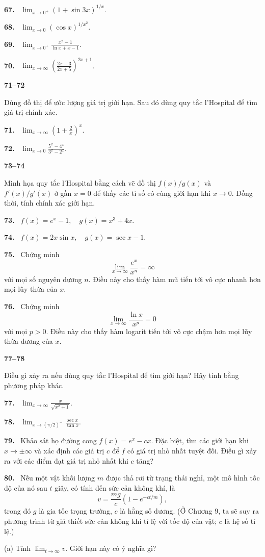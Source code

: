 \documentclass[12pt,a4paper]{article}
\newcommand{\bt}[1]{\par\smallskip\Needspace{5\baselineskip}\noindent\textbf{#1.}\ }
\newcommand{\group}[1]{\par\medskip\noindent\textbf{#1}\par\nopagebreak[4]}
\begin{document}
\bt{67} $\displaystyle\lim_{x\to0^+}(1+\sin3x)^{1/x}$.
\bt{68} $\displaystyle\lim_{x\to0}(\cos x)^{1/x^2}$.
\bt{69} $\displaystyle\lim_{x\to0^+}\frac{x^x-1}{\ln x+x-1}$.
\bt{70} $\displaystyle\lim_{x\to\infty}\left(\frac{2x-3}{2x+5}\right)^{2x+1}$.
\group{71–72} Dùng đồ thị để ước lượng giá trị giới hạn. Sau đó dùng quy tắc l’Hospital để tìm giá trị chính xác.
\bt{71} $\displaystyle\lim_{x\to\infty}\left(1+\frac2x\right)^x$.
\bt{72} $\displaystyle\lim_{x\to0}\frac{5^x-4^x}{3^x-2^x}$.
\group{73–74} Minh họa quy tắc l’Hospital bằng cách vẽ đồ thị $f(x)/g(x)$ và $f'(x)/g'(x)$ ở gần $x=0$ để thấy các tỉ số có cùng giới hạn khi $x\to0$. Đồng thời, tính chính xác giới hạn.
\bt{73} $f(x)=e^x-1,\quad g(x)=x^3+4x$.
\bt{74} $f(x)=2x\sin x,\quad g(x)=\sec x-1$.
\bt{75} Chứng minh
\[\lim_{x\to\infty}\frac{e^x}{x^n}=\infty\]
với mọi số nguyên dương $n$. Điều này cho thấy hàm mũ tiến tới vô cực nhanh hơn mọi lũy thừa của $x$.
\bt{76} Chứng minh
\[\lim_{x\to\infty}\frac{\ln x}{x^p}=0\]
với mọi $p>0$. Điều này cho thấy hàm logarit tiến tới vô cực chậm hơn mọi lũy thừa dương của $x$.
\group{77–78} Điều gì xảy ra nếu dùng quy tắc l’Hospital để tìm giới hạn? Hãy tính bằng phương pháp khác.
\bt{77} $\displaystyle\lim_{x\to\infty}\frac{x}{\sqrt{x^2+1}}$.
\bt{78} $\displaystyle\lim_{x\to(\pi/2)^-}\frac{\sec x}{\tan x}$.
\bt{79} Khảo sát họ đường cong $f(x)=e^x-cx$. Đặc biệt, tìm các giới hạn khi $x\to\pm\infty$ và xác định các giá trị $c$ để $f$ có giá trị nhỏ nhất tuyệt đối. Điều gì xảy ra với các điểm đạt giá trị nhỏ nhất khi $c$ tăng?
\bt{80} Nếu một vật khối lượng $m$ được thả rơi từ trạng thái nghỉ, một mô hình tốc độ của nó sau $t$ giây, có tính đến sức cản không khí, là
\[v=\frac{mg}{c}\left(1-e^{-ct/m}\right),\]
trong đó $g$ là gia tốc trọng trường, $c$ là hằng số dương. (Ở Chương 9, ta sẽ suy ra phương trình từ giả thiết sức cản không khí tỉ lệ với tốc độ của vật; $c$ là hệ số tỉ lệ.)

(a) Tính $\lim_{t\to\infty}v$. Giới hạn này có ý nghĩa gì?
\end{document}
